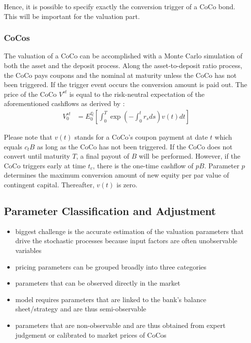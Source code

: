 Hence, it is possible to specify exactly the conversion trigger of a CoCo bond. This will be important for the valuation part.

\subsubsection*{CoCos}
The valuation of a CoCo can be accomplished with a Monte Carlo simulation of both the asset and the deposit process. Along the asset-to-deposit ratio process, the CoCo pays coupons and the nominal at maturity unless the CoCo has not been triggered. If the trigger event occurs the conversion amount is paid out. \citep{wilkens2014contingent} The price of the CoCo $V^{st}$ is equal to the risk-neutral expectation of the aforementioned cashflows as derived by \citet{pennacchi2010structural}:
\begin{align}
V_0^{st} &= E_0^{\mathbb{Q}} \left[ \int_0^T \exp\left(-\int_0^t r_s ds\right) v\left( t \right) dt \right]
\end{align}

Please note that $v(t)$ stands for a CoCo's coupon payment at date $t$ which equals $c_t B$ as long as the CoCo has not been triggered. If the CoCo does not convert until maturity $T$, a final payout of $B$ will be performed. However, if the CoCo triggers early at time $t_c$, there is the one-time cashflow of $pB$. Parameter $p$ determines the maximum conversion amount of new equity per par value of contingent capital. Thereafter, $v(t)$ is zero.

\subsection{Parameter Classification and Adjustment}

\begin{itemize}
\item biggest challenge is the accurate estimation of the valuation parameters that drive the stochastic processes \citep{de2014handbook} because input factors are often unobservable variables
\end{itemize}

\begin{itemize}
\item pricing parameters can be grouped broadly into three categories
\item parameters that can be observed directly in the market
\item model requires parameters that are linked to the bank's balance sheet/strategy and are thus semi-observable
\item parameters that are non-observable and are thus obtained from expert judgement or calibrated to market prices of CoCos
\end{itemize}

